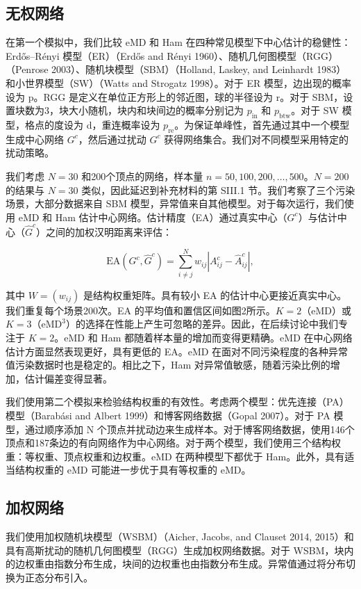 \documentclass[
  10
]{article}
\begin{document}
\subsection{无权网络}

在第一个模拟中，我们比较 eMD 和 Ham 在四种常见模型下中心估计的稳健性：Erdős–Rényi 模型（ER）（Erdős and Rényi 1960）、随机几何图模型（RGG）（Penrose 2003）、随机块模型（SBM）（Holland, Laskey, and Leinhardt 1983）和小世界模型（SW）（Watts and Strogatz 1998）。对于 ER 模型，边出现的概率设为 p。RGG 是定义在单位正方形上的邻近图，球的半径设为 r。对于 SBM，设置块数为3，块大小随机，块内和块间边的概率分别记为 $p_{\text{in}}$ 和 $p_{\text{btw}}$。对于 SW 模型，格点的度设为 d，重连概率设为 $p_{\text{re}}$。为保证单峰性，首先通过其中一个模型生成中心网络 $G^c$，然后通过扰动 $G^c$ 获得网络集合。我们对不同模型采用特定的扰动策略。

我们考虑 $N=30$ 和200个顶点的网络，样本量 $n=50,100,200,\dots,500$。$N=200$ 的结果与 $N=30$ 类似，因此延迟到补充材料的第 SIII.1 节。我们考察了三个污染场景，大部分数据来自 SBM 模型，异常值来自其他模型。对于每次运行，我们使用 eMD 和 Ham 估计中心网络。估计精度（EA）通过真实中心（$G^c$）与估计中心（$\hat{G}^c$）之间的加权汉明距离来评估：

$$
\mathrm{EA}(G^c,\hat{G}^c)=\sum_{i\neq j}^N w_{ij}|A_{ij}^c-\hat{A}_{ij}^c|,
$$

其中 $W=(w_{ij})$ 是结构权重矩阵。具有较小 EA 的估计中心更接近真实中心。我们重复每个场景200次。EA 的平均值和置信区间如图2所示。$K=2$（eMD）或 $K=3$（$\mathrm{eMD}^3$）的选择在性能上产生可忽略的差异。因此，在后续讨论中我们专注于 $K=2$。eMD 和 Ham 都随着样本量的增加而变得更精确。eMD 在中心网络估计方面显然表现更好，具有更低的 EA。eMD 在面对不同污染程度的各种异常值污染数据时也是稳定的。相比之下，Ham 对异常值敏感，随着污染比例的增加，估计偏差变得显著。

我们使用第二个模拟来检验结构权重的有效性。考虑两个模型：优先连接（PA）模型（Barabási and Albert 1999）和博客网络数据（Gopal 2007）。对于 PA 模型，通过顺序添加 N 个顶点并扰动边来生成样本。对于博客网络数据，使用146个顶点和187条边的有向网络作为中心网络。对于两个模型，我们使用三个结构权重：等权重、顶点权重和边权重。eMD 在两种模型下都优于 Ham。此外，具有适当结构权重的 eMD 可能进一步优于具有等权重的 eMD。

\subsection{加权网络}

我们使用加权随机块模型（WSBM）（Aicher, Jacobs, and Clauset 2014, 2015）和具有高斯扰动的随机几何图模型（RGG）生成加权网络数据。对于 WSBM，块内的边权重由指数分布生成，块间的边权重也由指数分布生成。异常值通过将分布切换为正态分布引入。
\end{document}
